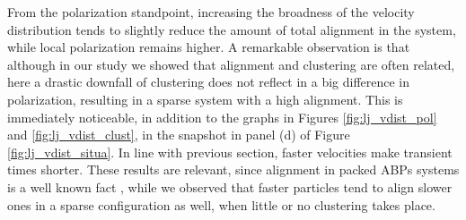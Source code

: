 \documentclass[../../master_thesis_np.tex]{subfiles}
\begin{document}
		From the polarization standpoint, increasing the broadness of the velocity distribution tends to slightly reduce the amount of total alignment in the system, while local polarization remains higher. 
		A remarkable observation is that although in our study we showed that alignment and clustering are often related, here a drastic downfall of clustering does not reflect in a big difference in polarization, resulting in a sparse system with a high alignment.
		This is immediately noticeable, in addition to the graphs in Figures \ref{fig:lj_vdist_pol} and \ref{fig:lj_vdist_clust}, in the snapshot in panel (d) of Figure \ref{fig:lj_vdist_situa}.
		In line with previous section, faster velocities make transient times shorter.
		These results are relevant, since alignment in packed ABPs systems is a well known fact \cite{caprini_spontaneous_2020}, while we observed that faster particles tend to align slower ones in a sparse configuration as well, when little or no clustering takes place.
		
\end{document}
